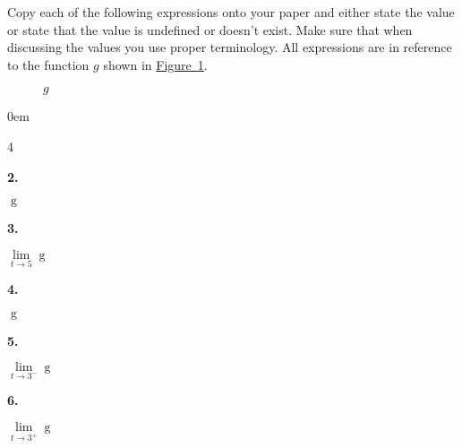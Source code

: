 \documentclass[12pt,]{book}
\theoremstyle{plain}
\theoremstyle{definition}
\numberwithin{equation}{section}
\newenvironment{exercisegroup}%
{\medskip\noindent}%
{\par\bigskip}%
\newlength{\exercisegroupindent}%
\newlength{\exercisegroupitemwidth}%
\newenvironment{exercisegrouplist}%
{\vspace{-\partopsep}%
\begin{adjustwidth}{\exercisegroupindent}{0em}}%
{\end{adjustwidth}%
\vspace{-\partopsep}%
\vspace{\baselineskip}}%
\newenvironment{exercisegroupbycol}[1]%
{\begin{exercisegrouplist}%
\vspace{-\multicolsep}%
\begin{multicols}{#1}%
\setlength{\parindent}{0em}%
\setlength{\exercisegroupitemwidth}{\linewidth}}%
{\end{multicols}%
\vspace{-\multicolsep}%
\end{exercisegrouplist}}%
\newenvironment{exercisegroupitem}[1]%
{\begin{minipage}[t]{\exercisegroupitemwidth}
\vspace{0pt}%
{\bfseries#1}%
\rule{0pt}{\baselineskip}}{\strut%
\end{minipage}%
\hspace{\columnsep}}%
\providecommand\phantomsection{}
\newcommand{\fe}[2]{\mathop{{#1}{\left(#2\right)}}}
\begin{document}
\begin{exercisegroup}%
Copy each of the following expressions onto your paper and either state the value or state that the value is undefined or doesn't exist. Make sure that when discussing the values you use proper terminology. All expressions are in reference to the function \(g\) shown in \hyperref[figure-second-limit]{Figure~\ref*{figure-second-limit}}.%
\begin{figure}
\centering
{
}
\caption{\(g\)\label{figure-second-limit}}
\end{figure}
\begin{exercisegroupbycol}{4}%
\begin{exercisegroupitem}{2. }\phantomsection\hypertarget{exercise-31}{\null}
\(\fe{g}{5}\)%
\end{exercisegroupitem}%
\par%
\begin{exercisegroupitem}{3. }\phantomsection\hypertarget{exercise-32}{\null}
\(\lim\limits_{t\to5}\fe{g}{t}\)%
\end{exercisegroupitem}%
\par%
\begin{exercisegroupitem}{4. }\phantomsection\hypertarget{exercise-33}{\null}
\(\fe{g}{3}\)%
\end{exercisegroupitem}%
\par%
\begin{exercisegroupitem}{5. }\phantomsection\hypertarget{exercise-34}{\null}
\(\lim\limits_{t\to3^{-}}\fe{g}{t}\)%
\end{exercisegroupitem}%
\par%
\begin{exercisegroupitem}{6. }\phantomsection\hypertarget{exercise-35}{\null}
\(\lim\limits_{t\to3^{+}}\fe{g}{t}\)%
\end{exercisegroupitem}%

\end{exercisegroupbycol}
\end{exercisegroup}
\end{document}
